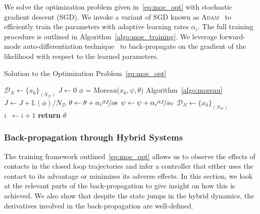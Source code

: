 We solve the optimization problem given in~\eqref{eq:moe_opt} with stochastic
gradient descent (SGD).
%
We invoke a variant of SGD known as \textsc{Adam}~\cite{kingma2014adam} to
efficiently train the parameters with adaptive learning rates $\alpha_i$.
%
The full training procedure is outlined in Algorithm~\eqref{algo:moe_training}.
%
We leverage forward-mode auto-differentiation technique~\cite{revels2016forward}
to back-propagate on the gradient of the likelihood with respect to the learned
parameters.
\begin{algorithm}[tb]
      \caption{Solution to the Optimization Problem~\eqref{eq:moe_opt}}
      \label{algo:moe_training}
      \small
      \begin{algorithmic}[1]
          \algrenewcommand\algorithmicindent{0em} %
          \State $\mathcal{D}_N \gets \{x_0\}_{(N_{\mathcal{D}})}$   
          \algrenewcommand\algorithmicindent{1.1em} %
          \State $J \gets 0$
              \State $\phi$ = Moreau($x_0, \psi, \theta$) \Comment Algorithm~\eqref{algo:moreau}
              \State $J \gets J + \mathbb{L}(\phi)/N_{\mathcal{D}}$ 
          \EndFor
          \State $\theta \gets \theta + \alpha_i \nicefrac{\partial J}{\partial \theta}$
          \State $\psi \gets \psi + \alpha_i \nicefrac{\partial J}{\partial \psi}$
          \State $\mathcal{D}_N \gets \{x_0\}_{(N_{\mathcal{D}})}$
          \State $i \;\:\gets i + 1$
          \EndWhile
          \State \textbf{return} $\theta$
      \end{algorithmic}
  \end{algorithm}

\subsubsection{Back-propagation through Hybrid Systems}

The training framework outlined~\eqref{eq:moe_opt} allows us to observe the
effects of contacts in the closed loop trajectories and infer a controller that
either uses the contact to its advantage or minimizes its adverse effects.
%
In this section, we look at the relevant parts of the back-propagation to give
insight on how this is achieved.
%
We also show that despite the state jumps in the hybrid dynamics, the
derivatives involved in the back-propagation are well-defined.

